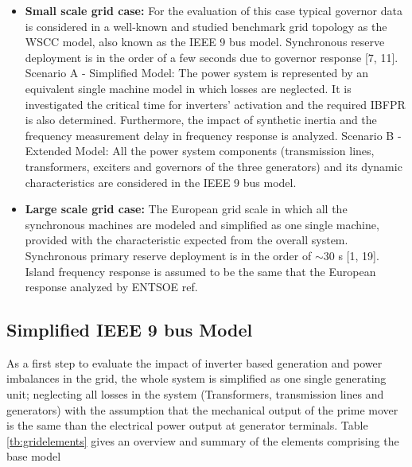 \begin{itemize}[leftmargin=*,labelsep=5.8mm]
	\item \textbf{Small scale grid case:} For the evaluation of this case typical governor data is considered in a well-known and studied benchmark grid topology as the WSCC model, also known as the IEEE 9 bus model. Synchronous reserve deployment is in the order of a few seconds due to governor response [7, 11].
	\subitem Scenario A - Simplified Model: The power system is represented by an equivalent single machine model in which losses are neglected. It is investigated the critical time for inverters' activation and the required IBFPR is  also determined. Furthermore, the impact of synthetic inertia and the frequency measurement delay in frequency response is analyzed.
	\subitem Scenario B - Extended Model: All the power system components (transmission lines, transformers, exciters and governors of the three generators) and its dynamic characteristics are considered in the IEEE 9 bus model.\\
	\item \textbf{Large scale grid case:} The European grid scale in which all the synchronous machines are modeled and simplified as one single machine, provided with the characteristic expected from the overall system. Synchronous primary reserve deployment is in the order of $ \sim30 $ s [1, 19]. Island frequency response is assumed to be the same that the European response analyzed by ENTSOE ref.
\end{itemize}



\subsection{Simplified IEEE 9 bus Model}
\label{ssec:simpleieee}
As a first step to evaluate the impact of inverter based generation and power imbalances in the grid, the whole system is simplified as one single generating unit; neglecting all losses in the system (Transformers, transmission lines and generators) with the assumption that the mechanical output of the prime mover is the same than the electrical power output at generator terminals. Table \ref{tb:gridelements} gives an overview and summary of the elements comprising the base model\\

